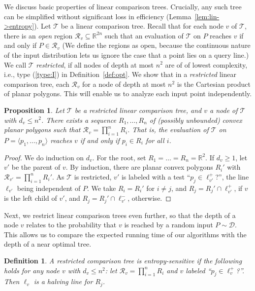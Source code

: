 \documentclass[letterpaper,11pt]{article}
\newtheorem{definition}[theorem]{Definition}
\newtheorem{prop}[theorem]{Proposition}
\newcommand{\R}{\mathbb{R}}
\newcommand{\cD}{\mathcal{D}}
\newcommand{\cR}{\mathcal{R}}
\newcommand{\cT}{\mathcal{T}}
\begin{document}
We discuss  basic properties 
of linear comparison trees.
Crucially,  
any such tree can be
simplified without significant loss in
efficiency (Lemma~\ref{lem:lin->entropy}).
Let $\cT$ be a linear comparison tree.
Recall that for each node $v$ of $\cT$, 
there is an \emph{open} region 
$\cR_v \subseteq \R^{2n}$ such that 
an evaluation of $\cT$ on $P$ reaches $v$ 
if and only if $P \in \cR_v$
(We define the regions as open,
because the continuous nature of
the input distribution lets us 
ignore the case that a point
lies on a query line.)
We call $\cT$
\emph{restricted}, if all nodes 
of depth at most $n^2$ are of
of lowest complexity, 
i.e., type (\ref{type:I})
in Definition~\ref{def:opt}.
We show 
that in a \emph{restricted} linear 
comparison tree, each $\cR_v$ for
a node of depth at most $n^2$ is 
the Cartesian product of planar polygons. 
This will enable us to analyze each input point
independently.

\begin{prop}\label{prop:Cartesian}
  Let $\cT$ be a restricted linear 
  comparison tree, and $v$ a node of
  $\cT$ with $d_v \leq n^2$. There exists a sequence 
  $R_1, \dots, R_n$
  of (possibly unbounded) convex planar 
  polygons such that 
  $\cR_v = \prod_{i=1}^n R_i$. 
  That is, the evaluation of $\cT$ on 
  $P = \langle p_1, \dots, p_n \rangle$ 
  reaches $v$ if and only 
  if $p_i \in R_i$ for all $i$.
\end{prop}

\begin{proof}
  We do induction on $d_v$. For the root, 
  set $R_1 = \dots = R_n = \R^2$. If 
  $d_v \geq 1$, let $v'$ be the
  parent of $v$. By induction, there 
  are planar convex polygons $R_i'$ with 
  $\cR_{v'} = \prod_{i=1}^n R_i'$. 
  As $\cT$ is restricted, $v'$ is 
  labeled with a test 
  ``$p_j \in \ell_{v'}^+$?'', 
  the line $\ell_{v'}$ being independent of 
  $P$. We take $R_i = R_i'$ for $i \neq j$, 
  and $R_j = R_j' \cap \ell_{v'}^+$, if $v$ is 
  the left child of $v'$, and 
  $R_j = R_j' \cap \ell_{v'}^-$, otherwise.
\end{proof}

Next, we restrict linear comparison 
trees even further, so that the depth 
of a node $v$ relates to the probability 
that $v$ is reached by a random input 
$P \sim \cD$. This allows us to
compare the expected running time of our algorithms 
with the depth of a near optimal tree.

\begin{definition}
  A restricted 
  comparison tree is 
  \emph{entropy-sensitive} if the 
  following holds for any node $v$
  with $d_v \leq n^2$:
  let $\cR_v = \prod_{i=1}^{n} R_i$
  and $v$ labeled 
  ``$p_j \in \ell_{v}^+$\textup{?}''.
  Then $\ell_v$ is a halving line for $R_j$.
\end{definition}
\end{document}

